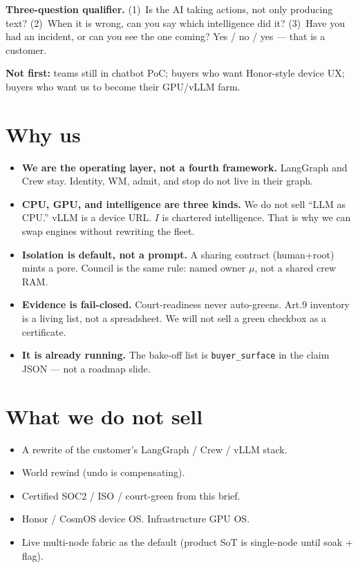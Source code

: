 \documentclass[10pt]{article}
\begin{document}
\vspace{0.15em}
\textbf{Three-question qualifier.} (1)~Is the AI taking actions, not only producing text? (2)~When it is wrong, can you say which intelligence did it? (3)~Have you had an incident, or can you see the one coming? Yes / no / yes --- that is a customer.

\textbf{Not first:} teams still in chatbot PoC; buyers who want Honor-style device UX; buyers who want us to become their GPU/vLLM farm.

\section{Why us}

\begin{itemize}
  \item \textbf{We are the operating layer, not a fourth framework.} LangGraph and Crew stay. Identity, WM, admit, and stop do not live in their graph.
  \item \textbf{CPU, GPU, and intelligence are three kinds.} We do not sell ``LLM as CPU.'' vLLM is a device URL. $I$ is chartered intelligence. That is why we can swap engines without rewriting the fleet.
  \item \textbf{Isolation is default, not a prompt.} A sharing contract (human+root) mints a pore. Council is the same rule: named owner $\mu$, not a shared crew RAM.
  \item \textbf{Evidence is fail-closed.} Court-readiness never auto-greens. Art.9 inventory is a living list, not a spreadsheet. We will not sell a green checkbox as a certificate.
  \item \textbf{It is already running.} The bake-off list is \texttt{buyer\_surface} in the claim JSON --- not a roadmap slide.
\end{itemize}

\section{What we do not sell}

\begin{itemize}
  \item A rewrite of the customer's LangGraph / Crew / vLLM stack.
  \item World rewind (undo is compensating).
  \item Certified SOC2 / ISO / court-green from this brief.
  \item Honor / CosmOS device OS. Infrastructure GPU OS.
  \item Live multi-node fabric as the default (product SoT is single-node until soak + flag).
\end{itemize}
\end{document}
